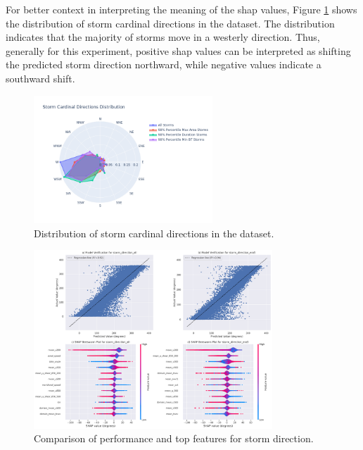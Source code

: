 For better context in interpreting the meaning of the \acrshort{shap} values, Figure \ref{fig:storm_cardinal_directions_distribution} shows the distribution of storm cardinal directions in the dataset. The distribution indicates that the majority of storms move in a westerly direction. Thus, generally for this experiment, positive \acrshort{shap} values can be interpreted as shifting the predicted storm direction northward, while negative values indicate a southward shift.

\begin{figure}[ht]
    \centering
    \includegraphics[width=0.6\textwidth]{../figures/generated/exploration/storm_cardinal_directions_distribution.png}
    \caption{Distribution of storm cardinal directions in the dataset.}
    \label{fig:storm_cardinal_directions_distribution}
\end{figure}

\begin{figure}[ht]
    \centering
    \includegraphics[width=0.8\textwidth]{../figures/generated/experiments/storm_direction/storm_direction_summary.png}
    \caption{Comparison of performance and top features for storm direction.}
    \label{fig:storm_direction_summary}
\end{figure}

